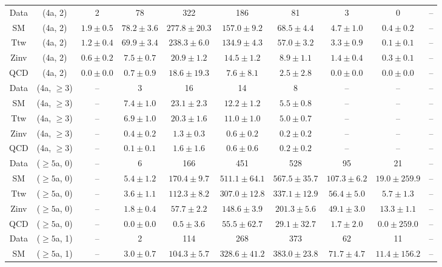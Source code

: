 \begin{table}[h!]
{\begin{tabular}{cccccccccc}
	Data & (4a, 2) & 2 & 78 & 322 & 186 & 81 & 3 & 0 & -- \\[0.5ex] 
	SM & (4a, 2) & $1.9\pm 0.5$ & $78.2\pm 3.6$ & $277.8\pm 20.3$ & $157.0\pm 9.2$ & $68.5\pm 4.4$ & $4.7\pm 1.0$ & $0.4\pm 0.2$ & -- \\[0.5ex] 
	Ttw & (4a, 2) & $1.2\pm 0.4$ & $69.9\pm 3.4$ & $238.3\pm 6.0$ & $134.9\pm 4.3$ & $57.0\pm 3.2$ & $3.3\pm 0.9$ & $0.1\pm 0.1$ & -- \\[0.5ex] 
	Zinv & (4a, 2) & $0.6\pm 0.2$ & $7.5\pm 0.7$ & $20.9\pm 1.2$ & $14.5\pm 1.2$ & $8.9\pm 1.1$ & $1.4\pm 0.4$ & $0.3\pm 0.1$ & -- \\[0.5ex] 
	QCD & (4a, 2) & $0.0\pm 0.0$ & $0.7\pm 0.9$ & $18.6\pm 19.3$ & $7.6\pm 8.1$ & $2.5\pm 2.8$ & $0.0\pm 0.0$ & $0.0\pm 0.0$ & -- \\[0.5ex] 
	Data & (4a, $\ge3$) & -- & 3 & 16 & 14 & 8 & -- & -- & -- \\[0.5ex] 
	SM & (4a, $\ge3$) & -- & $7.4\pm 1.0$ & $23.1\pm 2.3$ & $12.2\pm 1.2$ & $5.5\pm 0.8$ & -- & -- & -- \\[0.5ex] 
	Ttw & (4a, $\ge3$) & -- & $6.9\pm 1.0$ & $20.3\pm 1.6$ & $11.0\pm 1.0$ & $5.0\pm 0.7$ & -- & -- & -- \\[0.5ex] 
	Zinv & (4a, $\ge3$) & -- & $0.4\pm 0.2$ & $1.3\pm 0.3$ & $0.6\pm 0.2$ & $0.2\pm 0.2$ & -- & -- & -- \\[0.5ex] 
	QCD & (4a, $\ge3$) & -- & $0.1\pm 0.1$ & $1.6\pm 1.6$ & $0.6\pm 0.6$ & $0.2\pm 0.2$ & -- & -- & -- \\[0.5ex] 
	Data & ($\ge5$a, 0) & -- & 6 & 166 & 451 & 528 & 95 & 21 & -- \\[0.5ex] 
	SM & ($\ge5$a, 0) & -- & $5.4\pm 1.2$ & $170.4\pm 9.7$ & $511.1\pm 64.1$ & $567.5\pm 35.7$ & $107.3\pm 6.2$ & $19.0\pm 259.9$ & -- \\[0.5ex] 
	Ttw & ($\ge5$a, 0) & -- & $3.6\pm 1.1$ & $112.3\pm 8.2$ & $307.0\pm 12.8$ & $337.1\pm 12.9$ & $56.4\pm 5.0$ & $5.7\pm 1.3$ & -- \\[0.5ex] 
	Zinv & ($\ge5$a, 0) & -- & $1.8\pm 0.4$ & $57.7\pm 2.2$ & $148.6\pm 3.9$ & $201.3\pm 5.6$ & $49.1\pm 3.0$ & $13.3\pm 1.1$ & -- \\[0.5ex] 
	QCD & ($\ge5$a, 0) & -- & $0.0\pm 0.0$ & $0.5\pm 3.6$ & $55.5\pm 62.7$ & $29.1\pm 32.7$ & $1.7\pm 2.0$ & $0.0\pm 259.0$ & -- \\[0.5ex] 
	Data & ($\ge5$a, 1) & -- & 2 & 114 & 268 & 373 & 62 & 11 & -- \\[0.5ex] 
	SM & ($\ge5$a, 1) & -- & $3.0\pm 0.7$ & $104.3\pm 5.7$ & $328.6\pm 41.2$ & $383.0\pm 23.8$ & $71.7\pm 4.7$ & $11.4\pm 156.2$ & -- \\[0.5ex] 

\end{tabular}}
\end{table}
